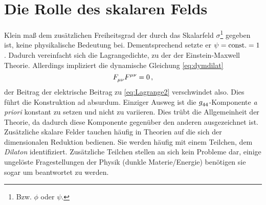 \section{Die Rolle des skalaren Felds}
  Klein maß dem zusätzlichen Freiheitsgrad der durch das Skalarfeld
  $\sigma$\footnote{Bzw. $\phi$ oder $\psi$.} gegeben ist, keine physikalische
  Bedeutung bei.
  Dementsprechend setzte er $\psi=\mathrm{const.}=1$ .
 Dadurch vereinfacht sich die Lagrangedichte, zu der der Einstein-Maxwell
 Theorie.
 Allerdings impliziert die dynamische Gleichung
 \eqref{eq:dymdilat}
  \begin{equation}
\tensor*{F}{_\mu_\nu}\tensor*{F}{^\mu^\nu}=0\,,
 \end{equation}
 der Beitrag der elektrische Beitrag zu \eqref{eq:Lagrange2} verschwindet also.
 Dies führt die Konstruktion ad absurdum. Einziger Ausweg ist die $\tensor{g}{_4_4}$-Komponente
\emph{a priori} konstant zu setzen und nicht zu variieren. Dies trübt
die Allgemeinheit der Theorie, da dadurch diese Komponente gegenüber den anderen
ausgezeichnet ist. Zusätzliche skalare Felder tauchen häufig in Theorien auf die
sich der dimensionalen Reduktion bedienen. Sie werden häufig mit einem Teilchen,
dem \emph{Dilaton} identifiziert. Zusätzliche Teilchen stellen an sich kein
Probleme dar, einige ungelöste Fragestellungen der Physik (dunkle
Materie/Energie) benötigen sie sogar um beantwortet zu werden. 
